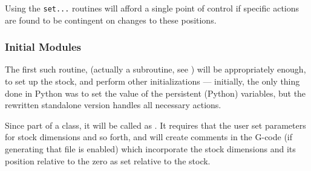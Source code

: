 \documentclass{ltxdoc}
\begin{document}
\noindent Using the \verb|set...| routines will afford a single point of control if specific actions are found to be contingent on changes to these positions.



\subsubsection{Initial Modules}

The first such routine, (actually a subroutine, see )  will be appropriately enough, to set up the stock, and perform other initializations --- initially, the only thing done in Python was to set the value of the persistent (Python) variables, but the rewritten standalone version handles all necessary actions.

Since part of a class, it will be called as . It requires that the user set parameters for stock dimensions and so forth, and will create comments in the G-code (if generating that file is enabled) which incorporate the stock dimensions and its position relative to the zero as set relative to the stock.
 
\end{document}
